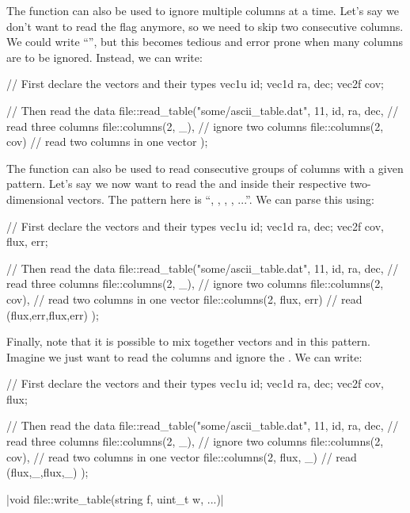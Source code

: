 The  function can also be used to ignore multiple columns at a time. Let's say we don't want to read the  flag anymore, so we need to skip two consecutive columns. We could write ``\cppinline{_, _}'', but this becomes tedious and error prone when many columns are to be ignored. Instead, we can write:
\begin{cppcode}
// First declare the vectors and their types
vec1u id;
vec1d ra, dec;
vec2f cov;

// Then read the data
file::read_table("some/ascii_table.dat", 11,
    id, ra, dec,          // read three columns
    file::columns(2, _),  // ignore two columns
    file::columns(2, cov) // read two columns in one vector
);
\end{cppcode}

The  function can also be used to read consecutive groups of columns with a given pattern. Let's say we now want to read the  and  inside their respective two-dimensional vectors. The pattern here is ``, , , , ...''. We can parse this using:
\begin{cppcode}
// First declare the vectors and their types
vec1u id;
vec1d ra, dec;
vec2f cov, flux, err;

// Then read the data
file::read_table("some/ascii_table.dat", 11,
    id, ra, dec,           // read three columns
    file::columns(2, _),   // ignore two columns
    file::columns(2, cov), // read two columns in one vector
    file::columns(2, flux, err) // read (flux,err,flux,err)
);
\end{cppcode}

Finally, note that it is possible to mix together vectors and \cppinline{_} in this pattern. Imagine we just want to read the  columns and ignore the . We can write:
\begin{cppcode}
// First declare the vectors and their types
vec1u id;
vec1d ra, dec;
vec2f cov, flux;

// Then read the data
file::read_table("some/ascii_table.dat", 11,
    id, ra, dec,           // read three columns
    file::columns(2, _),   // ignore two columns
    file::columns(2, cov), // read two columns in one vector
    file::columns(2, flux, _) // read (flux,_,flux,_)
);
\end{cppcode}

\funcitem \cppinline|void file::write_table(string f, uint_t w, ...)| 

